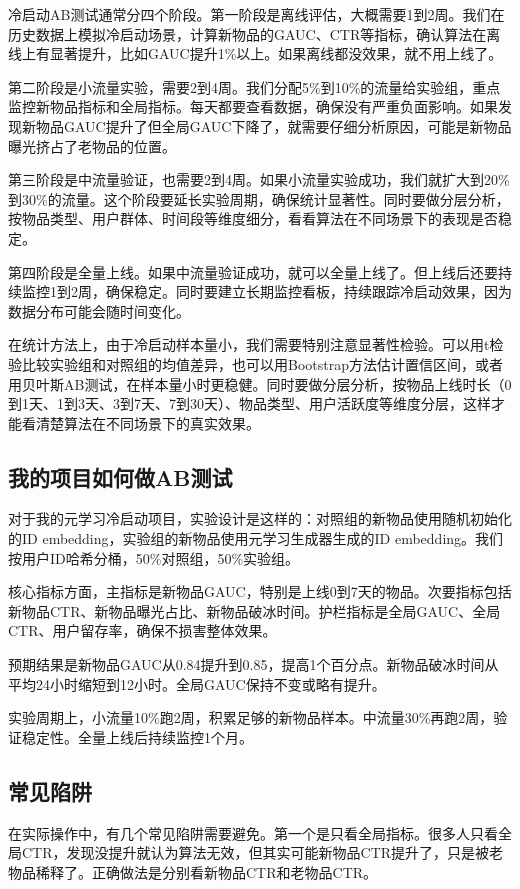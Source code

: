 \documentclass[UTF8]{ctexart}
\begin{document}
冷启动AB测试通常分四个阶段。第一阶段是离线评估，大概需要1到2周。我们在历史数据上模拟冷启动场景，计算新物品的GAUC、CTR等指标，确认算法在离线上有显著提升，比如GAUC提升1\%以上。如果离线都没效果，就不用上线了。

第二阶段是小流量实验，需要2到4周。我们分配5\%到10\%的流量给实验组，重点监控新物品指标和全局指标。每天都要查看数据，确保没有严重负面影响。如果发现新物品GAUC提升了但全局GAUC下降了，就需要仔细分析原因，可能是新物品曝光挤占了老物品的位置。

第三阶段是中流量验证，也需要2到4周。如果小流量实验成功，我们就扩大到20\%到30\%的流量。这个阶段要延长实验周期，确保统计显著性。同时要做分层分析，按物品类型、用户群体、时间段等维度细分，看看算法在不同场景下的表现是否稳定。

第四阶段是全量上线。如果中流量验证成功，就可以全量上线了。但上线后还要持续监控1到2周，确保稳定。同时要建立长期监控看板，持续跟踪冷启动效果，因为数据分布可能会随时间变化。

在统计方法上，由于冷启动样本量小，我们需要特别注意显著性检验。可以用t检验比较实验组和对照组的均值差异，也可以用Bootstrap方法估计置信区间，或者用贝叶斯AB测试，在样本量小时更稳健。同时要做分层分析，按物品上线时长（0到1天、1到3天、3到7天、7到30天）、物品类型、用户活跃度等维度分层，这样才能看清楚算法在不同场景下的真实效果。

\subsection{我的项目如何做AB测试}

对于我的元学习冷启动项目，实验设计是这样的：对照组的新物品使用随机初始化的ID embedding，实验组的新物品使用元学习生成器生成的ID embedding。我们按用户ID哈希分桶，50\%对照组，50\%实验组。

核心指标方面，主指标是新物品GAUC，特别是上线0到7天的物品。次要指标包括新物品CTR、新物品曝光占比、新物品破冰时间。护栏指标是全局GAUC、全局CTR、用户留存率，确保不损害整体效果。

预期结果是新物品GAUC从0.84提升到0.85，提高1个百分点。新物品破冰时间从平均24小时缩短到12小时。全局GAUC保持不变或略有提升。

实验周期上，小流量10\%跑2周，积累足够的新物品样本。中流量30\%再跑2周，验证稳定性。全量上线后持续监控1个月。

\subsection{常见陷阱}

在实际操作中，有几个常见陷阱需要避免。第一个是只看全局指标。很多人只看全局CTR，发现没提升就认为算法无效，但其实可能新物品CTR提升了，只是被老物品稀释了。正确做法是分别看新物品CTR和老物品CTR。
\end{document}
